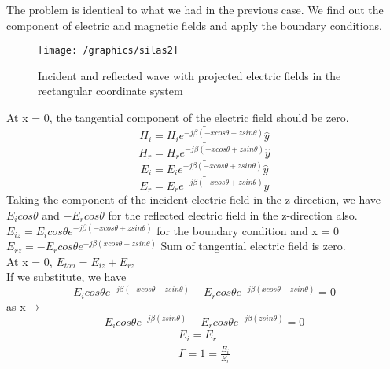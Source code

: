 The problem is identical to what we had in the previous case. We find out the component of electric and magnetic fields and apply the boundary conditions.
\begin{figure}[h]
\centering
\texttt{[image: /graphics/silas2]}
\caption{Incident and reflected wave with projected electric fields in the rectangular coordinate system}
\label{fig:silas2}
\end{figure}
At x = 0, the tangential component of the electric field should be zero.
\begin{equation*}
\bar{H_{i} = H_{i} e^{-j\beta(-xcos\theta + zsin\theta)} \hat{y}}
\end{equation*}
\begin{equation*}
\bar{H_{r} = H_{r} e^{-j\beta(-xcos\theta + zsin\theta)} \hat{y}}
\end{equation*}
\begin{equation*}
\bar{E_{i} = E_{i} e^{-j\beta(-xcos\theta + zsin\theta)} \hat{y}}
\end{equation*}
\begin{equation*}
\bar{E_{r} = E_{r} e^{-j\beta(-xcos\theta + zsin\theta)} \hat{y}}
\end{equation*}
Taking the component of the incident electric field in the z direction, we have $E_{i} cos\theta$ and $-E_{r}cos\theta$ for the reflected electric field in the z-direction also.\\
$E_{iz} = E_{i}cos\theta e^{-j\beta(-xcos\theta + zsin\theta)}$	for the boundary condition and x = 0\\
$E_{rz} = -E_{r}cos\theta e^{-j\beta(xcos\theta + zsin\theta)}$   Sum of tangential electric field is zero.\\
At x = 0, $E_{ton} = E_{iz} + E_{rz}$\\
If we substitute, we have\\
\begin{equation*}
E_{i}cos\theta e^{-j\beta(-xcos\theta + zsin\theta)} - E_{r}cos\theta e^{-j\beta(xcos\theta + zsin\theta)} = 0
\end{equation*}
as x$\rightarrow$
\begin{equation*}
E_{i}cos\theta e^{-j\beta(zsin\theta)} - E_{r}cos\theta e^{-j\beta(zsin\theta)} = 0
\end{equation*}
\begin{align*}
E_{i} = E_{r}\\
\Gamma= 1 = \frac{E_{i}}{E_{r}}
\end{align*}

